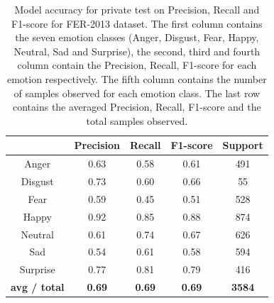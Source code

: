 \documentclass[master]{thesis-uestc}
\begin{document}
\begin{table}[ht]
\renewcommand{\arraystretch}{1.3}
\caption{Model accuracy for private test on Precision, Recall and F1-score for FER-2013 dataset. The first column contains the seven emotion classes (Anger, Disgust, Fear, Happy, Neutral, Sad and Surprise), the second, third and fourth column contain the Precision, Recall, F1-score for each emotion respectively. The fifth column contains the number of samples observed for each emotion class. The last row contains the averaged Precision, Recall, F1-score and the total samples observed.}
\label{table_fer2013_scores_private}
\begin{center}
\begin{tabular}{|c|c|c|c|c|}

\hline
 & Precision & Recall & F1-score & Support\\ \hline

Anger & 0.63 & 0.58 & 0.61 & 491\\ \hline
Disgust & 0.73 & 0.60 & 0.66 & 55\\ \hline
Fear & 0.59 & 0.45 & 0.51 & 528\\ \hline
Happy & 0.92 & 0.85 & 0.88 & 874\\ \hline
Neutral & 0.61 & 0.74 & 0.67 & 626\\ \hline
Sad & 0.54 & 0.61 & 0.58 & 594\\ \hline
Surprise & 0.77 & 0.81 & 0.79 & 416\\ \hline

\textbf{avg / total} & \textbf{0.69} & \textbf{0.69} & \textbf{0.69} & \textbf{3584}\\ \hline
\end{tabular}
\end{center}
\end{table}
\end{document}
